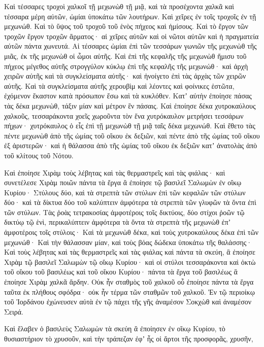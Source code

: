 {Καὶ τέσσαρες τροχοὶ χαλκοῖ τῇ μεχωνὼθ τῇ μιᾷ, καὶ τὰ προσέχοντα χαλκᾶ καὶ τέσσαρα μέρη αὐτῶν, ὠμίαι ὑποκάτω τῶν λουτήρων.
Καὶ χεῖρες ἐν τοῖς τροχοῖς ἐν τῇ μεχωνώθ. Καὶ τὸ ὕψος τοῦ τροχοῦ τοῦ ἑνὸς πήχεος καὶ ἡμίσους.
Καὶ τὸ ἔργον τῶν τροχῶν ἔργον τροχῶν ἅρματος· αἱ χεῖρες αὐτῶν καὶ οἱ νῶτοι αὐτῶν καὶ ἡ πραγματεία αὐτῶν πάντα χωνευτά.
Αἱ τέσσαρες ὠμίαι ἐπὶ τῶν τεσσάρων γωνιῶν τῆς μεχωνὼθ τῆς μιᾶς, ἐκ τῆς μεχωνὼθ οἱ ὦμοι αὐτῆς.
Καὶ ἐπὶ τῆς κεφαλῆς τῆς μεχωνὼθ ἥμισυ τοῦ πήχεος μέγεθος αὐτῆς στρογγύλον κύκλῳ ἐπὶ τῆς κεφαλῆς τῆς μεχωνώθ· καὶ ἀρχὴ χειρῶν αὐτῆς καὶ τὰ συγκλείσματα αὐτῆς· καὶ ἠνοίγετο ἐπὶ τὰς ἀρχὰς τῶν χειρῶν αὐτῆς.
Καὶ τὰ συγκλείσματα αὐτῆς χερουβὶμ καὶ λέοντες καὶ φοίνικες ἑστῶτα, ἐχόμενον ἕκαστον κατὰ πρόσωπον ἔσω καὶ τὰ κυκλόθεν.
Κατʼ αὐτὴν ἐποίησε πάσας τὰς δέκα μεχωνὼθ, τάξιν μίαν καὶ μέτρον ἓν πάσαις.
Καὶ ἐποίησε δέκα χυτροκαύλους χαλκοῦς, τεσσαράκοντα χοεῖς χωροῦντα τὸν ἕνα χυτρόκαυλον μετρήσει τεσσάρων πήχων· χυτρόκαυλος ὁ εἷς ἐπὶ τῇ μεχωνὼθ τῇ μιᾷ ταῖς δέκα μεχωνώθ.
Καὶ ἔθετο τὰς πέντε μεχωνὼθ ἀπὸ τῆς ὠμίας τοῦ οἴκου ἐκ δεξιῶν, καὶ πέντε ἀπὸ τῆς ὠμίας τοῦ οἴκου ἐξ ἀριστερῶν· καὶ ἡ θάλασσα ἀπὸ τῆς ὡμίας τοῦ οἴκου ἐκ δεξιῶν κατʼ ἀνατολὰς ἀπὸ τοῦ κλίτους τοῦ Νότου.
\par }{\PP {}Καὶ ἐποίησε Χιρὰμ τοὺς λέβητας καὶ τὰς θερμαστρεῖς καὶ τὰς φιάλας· καὶ συνετέλεσε Χιρὰμ ποιῶν πάντα τὰ ἔργα ἃ ἐποίησε τῷ βασιλεῖ Σαλωμὼν ἐν οἴκῳ Κυρίου·
Στύλους δύο, καὶ τὰ στρεπτὰ τῶν στύλων ἐπὶ τῶν κεφαλῶν τῶν στύλων δύο· καὶ τὰ δίκτυα δύο τοῦ καλύπτειν ἀμφότερα τὰ στρεπτὰ τῶν γλυφῶν τὰ ὄντα ἐπὶ τῶν στύλων.
Τὰς ῥοὰς τετρακοσίας ἀμφοτέροις τοῖς δικτύοις, δύο στίχοι ῥοῶν τῷ δικτύῳ τῷ ἑνὶ, περικαλύπτειν ἀμφότερα τὰ ὄντα τὰ στρεπτὰ τῆς μεχωνὼθ ἐπʼ ἀμφοτέροις τοῖς στύλοις·
Καὶ τὰ μεχωνὼθ δέκα, καὶ τοὺς χυτροκαύλους δέκα ἐπὶ τῶν μεχωνώθ·
Καὶ τὴν θάλασσαν μίαν, καὶ τοὺς βόας δώδεκα ὑποκάτω τῆς θαλάσσης·
Καὶ τοὺς λέβητας καὶ τὰς θερμαστρεῖς καὶ τὰς φιάλας καὶ πάντα τὰ σκεύη, ἃ ἐποίησε Χιρὰμ τῷ βασιλεῖ Σαλωμὼν τῷ οἴκῳ Κυρίου· καὶ οἱ στύλοι τεσσαράκοντα καὶ ὀκτὼ τοῦ οἴκου τοῦ βασιλέως καὶ τοῦ οἴκου Κυρίου· πάντα τὰ ἔργα τοῦ βασιλέως ἃ ἐποίησε Χιρὰμ χαλκᾶ ἄρδην.
Οὐκ ἦν σταθμὸς τοῦ χαλκοῦ οὗ ἐποίησε πάντα τὰ ἔργα ταῦτα ἐκ πλήθους σφόδρα· οὐκ ἦν τέρμα τῶν σταθμῶν τοῦ χαλκοῦ.
Ἐν τῷ περιοίκῳ τοῦ Ἰορδάνου ἐχώνευσεν αὐτὰ ἐν τῷ πάχει τῆς γῆς ἀναμέσον Σοκχὼθ καὶ ἀναμέσον Σειρά.
\par }{\PP {}Καὶ ἔλαβεν ὁ βασιλεὺς Σαλωμὼν τὰ σκεύη ἃ ἐποίησεν ἐν οἴκῳ Κυρίου, τὸ θυσιαστήριον τὸ χρυσοῦν, καὶ τὴν τράπεζαν ἐφʼ ἧς οἱ ἄρτοι τῆς προσφορᾶς, χρυσῆν,
}
